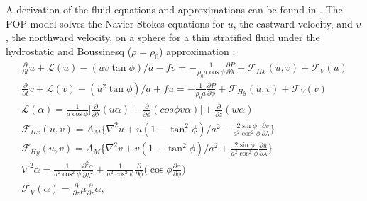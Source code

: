 A derivation of the fluid equations and approximations can be found in \cite{vallis}. The POP model solves the Navier-Stokes equations for $u$, the eastward velocity, and $v$, the northward velocity, on a sphere for a thin stratified fluid under the hydrostatic and Boussinesq ($\rho=\rho_0$) approximation \citep{SmithPop2010}:
\begingroup \belowdisplayskip=0pt \abovedisplayskip=0pt
\begin{gather}
\frac{\partial}{\partial t} u + \mathcal{L} (u) - (u v \tan \phi)/a - f v = -\frac{1}{\rho_0 a \cos \phi} \frac{\partial P}{\partial \lambda} + \mathcal{F}_{Hx}(u,v)+\mathcal{F}_V(u)\\ \label{equ}
\frac{\partial}{\partial t} v + \mathcal{L} (v) - (u^2 \tan \phi)/a + f u = -\frac{1}{\rho_0 a} \frac{\partial P}{\partial \phi} + \mathcal{F}_{Hy}(u,v)+\mathcal{F}_V(v)\\ \label{eqv}
%
\mathcal{L}(\alpha) = \frac{1}{a \cos\phi} \big[\frac{\partial}{\partial \lambda}(u\alpha)+\frac{\partial}{\partial \phi}(cos\phi v \alpha) \big] + \frac{\partial}{\partial z}(w\alpha)\\
%
\mathcal{F}_{Hx}(u,v) = A_M \big\{ \nabla^2 u + u(1-\tan^2\phi)/a^2 - \frac{2 \sin\phi}{a^2 \cos^2\phi}\frac{\partial v}{\partial \lambda}\big\}\label{W1}\\
%
\mathcal{F}_{Hy}(u,v) = A_M \big\{ \nabla^2 v + v(1-\tan^2\phi)/a^2 + \frac{2 \sin\phi}{a^2 \cos^2\phi}\frac{\partial u}{\partial \lambda}\big\}\label{W2}\\
%
\nabla^2\alpha = \frac{1}{a^2 \cos^2\phi}\frac{\partial^2 \alpha}{\partial \lambda^2}+\frac{1}{a^2 \cos^2\phi}\frac{\partial}{\partial \phi}\big(\cos\phi \frac{\partial\alpha}{\partial \phi}\big)\\
%
\mathcal{F}_V(\alpha) = \frac{\partial}{\partial z}\mu\frac{\partial}{\partial z}\alpha,
\end{gather}
\endgroup
